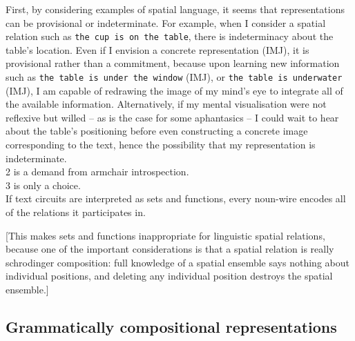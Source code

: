 First, by considering examples of spatial language, it seems that representations can be provisional or indeterminate. For example, when I consider a spatial relation such as \texttt{the cup is on the table}, there is indeterminacy about the table's location. Even if I envision a concrete representation (IMJ), it is provisional rather than a commitment, because upon learning new information such as \texttt{the table is under the window} (IMJ), or \texttt{the table is underwater} (IMJ), I am capable of redrawing the image of my mind's eye to integrate all of the available information. Alternatively, if my mental visualisation were not reflexive but willed -- as is the case for some aphantasics -- I could wait to hear about the table's positioning before even constructing a concrete image corresponding to the text, hence the possibility that my representation is indeterminate.\\

2 is a demand from armchair introspection.\\

3 is only a choice.\\

If text circuits are interpreted as sets and functions, every noun-wire encodes all of the relations it participates in.

[This makes sets and functions inappropriate for linguistic spatial relations, because one of the important considerations is that a spatial relation is really schrodinger composition: full knowledge of a spatial ensemble says nothing about individual positions, and deleting any individual position destroys the spatial ensemble.]

\subsection{Grammatically compositional representations}

